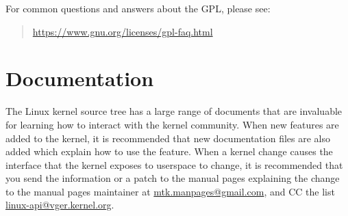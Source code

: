 \documentclass[a4paper,8pt,english]{sphinxmanual}
\begin{document}
For common questions and answers about the GPL, please see:
\begin{quote}

\href{https://www.gnu.org/licenses/gpl-faq.html}{https://www.gnu.org/licenses/gpl-faq.html}
\end{quote}


\section{Documentation}
\label{process/howto:documentation}
The Linux kernel source tree has a large range of documents that are
invaluable for learning how to interact with the kernel community.  When
new features are added to the kernel, it is recommended that new
documentation files are also added which explain how to use the feature.
When a kernel change causes the interface that the kernel exposes to
userspace to change, it is recommended that you send the information or
a patch to the manual pages explaining the change to the manual pages
maintainer at \href{mailto:mtk.manpages@gmail.com}{mtk.manpages@gmail.com}, and CC the list
\href{mailto:linux-api@vger.kernel.org}{linux-api@vger.kernel.org}.
\end{document}
